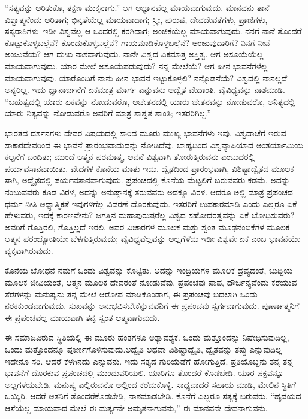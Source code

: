 “ಸತ್ಯವನ್ನು ಅರಿತುಕೊ, ತಕ್ಷಣ ಮುಕ್ತನಾಗು.” ಆಗ ಅಜ್ಞಾನವೆಲ್ಲ ಮಾಯವಾಗುವುದು. ಮಾನವನು ತಾನೆ ವಿಶ್ವಾತ್ಮನೆಂದು ಅರಿತಾಗ; ಭಿನ್ನತೆಯೆಲ್ಲ ಮಾಯವಾದಾಗ; ಸ್ತ್ರೀ, ಪುರುಷ, ದೇವದೇವತೆಗಳು, ಪ್ರಾಣಿಗಳು, ಸಸ್ಯರಾಶಿಗಳು–ಇಡೀ ವಿಶ್ವವೆಲ್ಲ ಆ ಒಂದರಲ್ಲಿ ಕರಗಿದಾಗ; ಅಂಜಿಕೆಯೆಲ್ಲ ಮಾಯವಾಗುವುದು. ನನಗೆ ನಾನೆ ತೊಂದರೆ ಕೊಟ್ಟುಕೊಳ್ಳಬಲ್ಲೆನೆ? ಕೊಂದುಕೊಳ್ಳಬಲ್ಲೆನೆ? ಗಾಯಮಾಡಿಕೊಳ್ಳಬಲ್ಲೆನೆ? ಅಂಜುವುದಾರಿಗೆ? ನಿನಗೆ ನೀನೆ ಅಂಜುವೆಯ? ಆಗ ದುಃಖ ನಾಶವಾಗುವುದು. ನಾನೇ ವಿಶ್ವದ ಏಕಮಾತ್ರ ಅಸ್ತಿತ್ವ. ಆಗ ಅಸೂಯೆಯೆಲ್ಲ ಮಾಯವಾಗುವುದು. ಯಾರ ಮೇಲೆ ಅಸೂಯೆಪಡುವುದು? ನನ್ನ ಮೇಲೆಯೆ? ಆಗ ಹೀನ ಭಾವನೆಗಳೆಲ್ಲ ಮಾಯವಾಗುವುವು. ಯಾರೊಂದಿಗೆ ನಾನು ಹೀನ ಭಾವನೆ ಇಟ್ಟುಕೊಳ್ಳಲಿ? ನನ್ನೊಡನೆಯೆ? ವಿಶ್ವದಲ್ಲಿ ನಾನಲ್ಲದೆ ಅನ್ಯರಿಲ್ಲ. ಇದು ಜ್ಞಾನಾರ್ಜನೆಗೆ ಏಕಮಾತ್ರ ಮಾರ್ಗ ಎನ್ನುವನು ಅದ್ವೈತ ವೇದಾಂತಿ. ವೈವಿಧ್ಯವನ್ನು ನಾಶಮಾಡಿ. “ಬಹುತ್ವದಲ್ಲಿ ಯಾರು ಏಕವನ್ನು ನೋಡುವರೊ, ಅಚೇತನದಲ್ಲಿ ಯಾರು ಚೇತನವನ್ನು ನೋಡುವರೊ, ಅನಿತ್ಯದಲ್ಲಿ ಯಾರು ನಿತ್ಯವನ್ನು ನೋಡುವರೊ ಅವರಿಗೆ ಮಾತ್ರ ಶಾಶ್ವತ ಶಾಂತಿ; ಇತರರಿಗಿಲ್ಲ.”

ಭಾರತದ ದರ್ಶನಗಳು ದೇವರ ವಿಷಯದಲ್ಲಿ ಸಾರಿದ ಮೂರು ಮುಖ್ಯ ಭಾವನೆಗಳು ಇವು. ವಿಶ್ವದಾಚೆಗೆ ಇರುವ ಸಾಕಾರದೇವರಿಂದ ಈ ಭಾವನೆ ಪ್ರಾರಂಭವಾದುದನ್ನು ನೋಡಿದೆವು. ಬಾಹ್ಯದಿಂದ ವಿಶ್ವವ್ಯಾಪಿಯಾದ ಅಂತರ್ಯಾಮಿಯ ಕಲ್ಪನೆಗೆ ಬಂದಿತು; ಮುಂದೆ ಆತ್ಮನೆ ಪರಮಾತ್ಮ, ಅವನೆ ವಿಶ್ವವಾಗಿ ತೋರುತ್ತಿರುವನು ಎಂಬುದರಲ್ಲಿ ಪರ್ಯವಸಾನವಾಯಿತು. ವೇದಗಳ ಕೊನೆಯ ಮಾತು ಇದು. ದ್ವೈತದಿಂದ ಪ್ರಾರಂಭವಾಗಿ, ವಿಶಿಷ್ಟಾದ್ವೈತದ ಮೂಲಕ ಸಾಗಿ, ಅದ್ವೈತದಲ್ಲಿ ಪರ್ಯವಸಾನವಾಗುವುದು. ಪ್ರಪಂಚದಲ್ಲಿ ಕೊನೆಯ ಮೆಟ್ಟಲಿಗೆ ಬರುವವರು ಕಡಮೆ. ಅದನ್ನು ನಂಬುವವರು ಕೂಡ ವಿರಳ, ಅದನ್ನು ಅನುಷ್ಠಾನಕ್ಕೆ ತರುವವರು ಅದಕ್ಕೂ ವಿರಳ. ಆದರೂ ಅಲ್ಲಿ ಮಾತ್ರ ಪ್ರಪಂಚದ ಧರ್ಮ ನೀತಿ ಆಧ್ಯಾತ್ಮಿಕತೆ ಇವುಗಳಿಗೆಲ್ಲ ವಿವರಣೆ ದೊರಕುವುದು. ಇತರರಿಗೆ ಉಪಕಾರಮಾಡಿ ಎಂದು ಎಲ್ಲರೂ ಏಕೆ ಹೇಳುವರು, ಇದಕ್ಕೆ ಕಾರಣವೇನು? ಜಗತ್ತಿನ ಮಹಾಪುರುಷರೆಲ್ಲ ವಿಶ್ವದ ಸಹೋದರತ್ವವನ್ನು ಏಕೆ ಬೋಧಿಸುವರು? ಅವರಿಗೆ ಗೊತ್ತಿರಲಿ, ಗೊತ್ತಿಲ್ಲದೆ ಇರಲಿ, ಅವರ ವಿಚಾರಗಳ ಮೂಲಕ ಮತ್ತು ಸ್ವಂತ ಮೂಢನಂಬಿಕೆಗಳ ಮೂಲಕ ಆತ್ಮನ ಪರಂಜ್ಯೋತಿಯೇ ಬೆಳಗುತ್ತಿರುವುದು; ವೈವಿಧ್ಯವೆಲ್ಲವನ್ನು ಅಲ್ಲಗೆಳೆದು ಇಡೀ ವಿಶ್ವವೇ ಏಕ ಎಂಬ ಭಾವನೆಯೇ ವ್ಯಕ್ತವಾಗಿರುವುದು.

ಕೊನೆಯ ಬೋಧನೆ ನಮಗೆ ಒಂದು ವಿಶ್ವವನ್ನು ಕೊಟ್ಟಿತು. ಅದನ್ನು ಇಂದ್ರಿಯಗಳ ಮೂಲಕ ದ್ರವ್ಯದಂತೆ, ಬುದ್ದಿಯ ಮೂಲಕ ಜೀವಿಯಂತೆ, ಆತ್ಮನ ಮೂಲಕ ದೇವರಂತೆ ನೋಡುವೆವು. ಪ್ರಪಂಚವು ಪಾಪ, ದೌರ್ಜನ್ಯವೆಂದು ಕರೆಯುವ ತೆರೆಗಳನ್ನು ಮನುಷ್ಯನು ತನ್ನ ಮೇಲೆ ಆರೋಪ ಮಾಡಿಕೊಂಡಾಗ, ಈ ಪ್ರಪಂಚವು ಬದಲಾಗಿ ಒಂದು ನರಕಕುಂಡವಾಗುವುದು. ಸುಖವನ್ನು ಅನುಭವಿಸಬೇಕೆನ್ನುವವನಿಗೆ ಈ ಪ್ರಪಂಚವು ಸ್ವರ್ಗವಾಗುವುದು. ಪೂರ್ಣಾತ್ಮನಿಗೆ ಈ ಪ್ರಪಂಚವೆಲ್ಲ ಮಾಯವಾಗಿ ತನ್ನ ಸ್ವಂತ ಆತ್ಮವಾಗುವುದು.

ಈ ಸಮಾಜವಿರುವ ಸ್ಥಿತಿಯಲ್ಲಿ ಈ ಮೂರು ಹಂತಗಳೂ ಅತ್ಯಾವಶ್ಯಕ. ಒಂದು ಮತ್ತೊಂದನ್ನು ನಿಷೇಧಿಸುವುದಿಲ್ಲ, ಒಂದು ಮತ್ತೊಂದನ್ನೂ ಪೂರ್ಣಗೊಳಿಸುವುದು.\break ಅದ್ವೈತಿ ಅಥವಾ ವಿಶಿಷ್ಟಾದ್ವೈತಿ, ದ್ವೈತವನ್ನು ತಪ್ಪು ಎನ್ನುವುದಿಲ್ಲ ಇದೇನೊ ಸರಿ. ಆದರೆ ಕೆಳಗಿನದು ಎನ್ನುವನು. ಇದು ಸತ್ಯದ ಗುರಿಯೆಡೆಗೆ ಹೋಗುತ್ತಿದೆ. ಪ್ರತಿಯೊಬ್ಬನು ತನ್ನ ತನ್ನ ಭಾವನೆಗೆ ದೊರಕುವ ಪ್ರಪಂಚದಲ್ಲಿ ಮುಂದುವರಿಯಲಿ. ಯಾರಿಗೂ ತೊಂದರೆ ಕೊಡಬೇಡಿ. ಯಾರ ಪಕ್ಷವನ್ನೂ ಅಲ್ಲಗಳೆಯಬೇಡಿ. ಮನುಷ್ಯ ಎಲ್ಲಿರುವನೊ ಅಲ್ಲಿಂದ ಕರೆದುಕೊಳ್ಳಿ. ಸಾಧ್ಯವಾದರೆ ಸಹಾಯ ಮಾಡಿ, ಮೇಲಿನ ಸ್ಥಿತಿಗೆ ಒಯ್ಯಿರಿ. ಆದರೆ ಆತನಿಗೆ ತೊಂದರೆಕೊಡಬೇಡಿ, ನಾಶಮಾಡಬೇಡಿ. ಕೊನೆಗೆ ಎಲ್ಲರೂ ಸತ್ಯಕ್ಕೆ ಬರುವರು. “ಹೃದಯದ ಆಸೆಯೆಲ್ಲ ಮಾಯವಾದ ಮೇಲೆ ಈ ಮರ್ತ್ಯನೇ ಅಮೃತನಾಗುವನು,” ಈ ಮಾನವನೇ ದೇವನಾಗುವನು.

